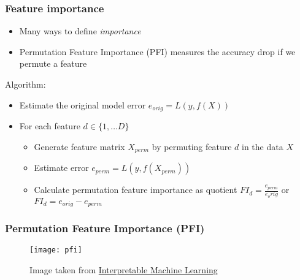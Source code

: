 \begin{frame}
  \frametitle{Feature importance}
  \begin{itemize}
    \item Many ways to define \emph{importance}
    \item Permutation Feature Importance (PFI) measures the accuracy drop if we permute a feature
  \end{itemize}

  \noindent\makebox[\linewidth]{\rule{\paperwidth}{0.4pt}}

  Algorithm:
  \begin{itemize}
    \item Estimate the original model error $e_{orig} = L(y,f(X))$
    \item For each feature $ d \in \{1, \ldots D\}$
    \begin{itemize}
      \item Generate feature matrix $X_{perm}$ by permuting feature $d$ in the data $X$
      \item Estimate error $e_{perm} = L(y,f(X_{perm}))$
      \item Calculate permutation feature importance as quotient $FI_d = \frac{e_{perm}}{e_orig}$ or $FI_d = e_{orig} - e_{perm}$
    \end{itemize}
  \end{itemize}

\end{frame}


\begin{frame}
  \frametitle{Permutation Feature Importance (PFI)}
  \begin{figure}
    \centering
    \texttt{[image: pfi]}
    \caption{Image taken from \href{https://christophm.github.io/interpretable-ml-book/feature-importance.html}{Interpretable Machine Learning}}
  \end{figure}
\end{frame}


